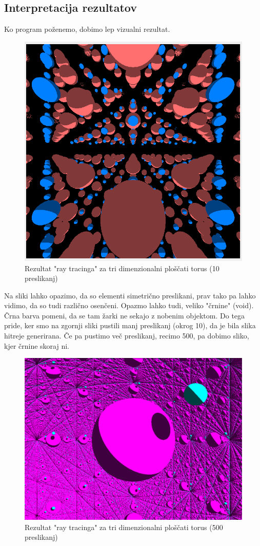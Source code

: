 \documentclass[titlepage]{article}
\begin{document}
\newpage
\subsection{Interpretacija rezultatov}
Ko program poženemo, dobimo lep vizualni rezultat.
\begin{figure}[H]
    \centering
    \includegraphics[width=0.5\linewidth]{Images/flat_torus.png}
    \caption{Rezultat "ray tracinga" za tri dimenzionalni ploščati torus (10 preslikanj)}
    \label{Slika:Rezultat "ray tracinga" za tri dimenzionalni ploščati torus 1}
\end{figure}
Na sliki lahko opazimo, da so elementi simetrično preslikani, prav tako pa lahko vidimo, da so tudi različno osenčeni. Opazmo lahko tudi, veliko "črnine" (void). Črna barva pomeni, da se tam žarki ne sekajo z nobenim objektom. Do tega pride, ker smo na zgornji sliki pustili manj preslikanj (okrog 10), da je bila slika hitreje generirana. Če pa pustimo več preslikanj, recimo 500, pa dobimo sliko, kjer črnine skoraj ni.

\begin{figure}[H]
    \centering
    \includegraphics[width=0.5\linewidth]{Images/flat_torus_more.png}
    \caption{Rezultat "ray tracinga" za tri dimenzionalni ploščati torus (500 preslikanj)}
    \label{Slika:Rezultat "ray tracinga" za tri dimenzionalni ploščati torus 2}
\end{figure}
\end{document}
